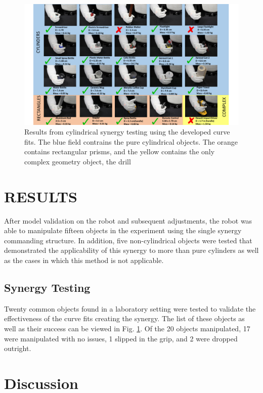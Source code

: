 \documentclass[runningheads,a4paper]{llncs}
\begin{document}
\begin{figure}[!b]
  \centering
  \includegraphics[width=1.08\linewidth]{Objects3.pdf}
  \caption{Results from cylindrical synergy testing using the developed curve fits.  The blue field contrains the pure cylindrical objects.  The orange contains rectangular prisms, and the yellow contains the only complex geometry object, the drill}
  \label{objects} 
\end{figure}

\section{RESULTS}
\label{results}


After model validation on the robot and subsequent adjustments, the robot was able to manipulate fifteen objects in the experiment using the single synergy commanding structure. In addition, five non-cylindrical objects were tested that demonstrated the applicability of this synergy to more than pure cylinders as well as the cases in which this method is not applicable.  


\subsection{Synergy Testing}

Twenty common objects found in a laboratory setting were tested to validate the effectiveness of the curve fits creating the synergy. The list of these objects as well as their success can be viewed in Fig. \ref{objects}.  Of the 20 objects manipulated, 17 were manipulated with no issues, 1 slipped in the grip, and 2 were dropped outright. 

\section{Discussion}
\label{discussion}
\end{document}
